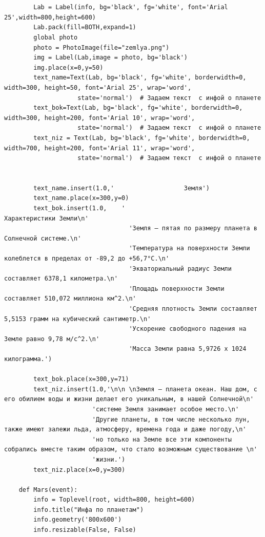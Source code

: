 \documentclass[11pt,a4paper]{report}
\begin{document}
\begin{verbatim}
        
    
        Lab = Label(info, bg='black', fg='white', font='Arial 25',width=800,height=600)  
        Lab.pack(fill=BOTH,expand=1)
        global photo
        photo = PhotoImage(file="zemlya.png")
        img = Label(Lab,image = photo, bg='black')
        img.place(x=0,y=50)
        text_name=Text(Lab, bg='black', fg='white', borderwidth=0, width=300, height=50, font='Arial 25', wrap='word',
                    state='normal')  # Задаем текст  с инфой о планете
        text_bok=Text(Lab, bg='black', fg='white', borderwidth=0, width=300, height=200, font='Arial 10', wrap='word',
                    state='normal')  # Задаем текст  с инфой о планете
        text_niz = Text(Lab, bg='black', fg='white', borderwidth=0, width=700, height=200, font='Arial 11', wrap='word',
                    state='normal')  # Задаем текст  с инфой о планете
    
       
        text_name.insert(1.0,'                   Земля')
        text_name.place(x=300,y=0)
        text_bok.insert(1.0,    '                                           Характеристики Земли\n' 
                                  'Земля – пятая по размеру планета в Солнечной системе.\n'
                                  'Температура на поверхности Земли колеблется в пределах от -89,2 до +56,7°C.\n'
                                  'Экваториальный радиус Земли составляет 6378,1 километра.\n'
                                  'Площадь поверхности Земли составляет 510,072 миллиона км^2.\n'
                                  'Средняя плотность Земли составляет 5,5153 грамм на кубический сантиметр.\n'
                                  'Ускорение свободного падения на Земле равно 9,78 м/с^2.\n'
                                  'Масса Земли равна 5,9726 х 1024 килограмма.')    
        
        text_bok.place(x=300,y=71)        
        text_niz.insert(1.0,'\n\n \nЗемля — планета океан. Наш дом, с его обилием воды и жизни делает его уникальным, в нашей Солнечной\n' 
                        'системе Земля занимает особое место.\n'
                        'Другие планеты, в том числе несколько лун, также имеют залежи льда, атмосферу, времена года и даже погоду,\n'
                        'но только на Земле все эти компоненты собрались вместе таким образом, что стало возможным существование \n' 
                        'жизни.')
        text_niz.place(x=0,y=300)

    def Mars(event):  
        info = Toplevel(root, width=800, height=600)
        info.title("Инфа по планетам")
        info.geometry('800x600')
        info.resizable(False, False)  
       

\end{verbatim}
\end{document}
